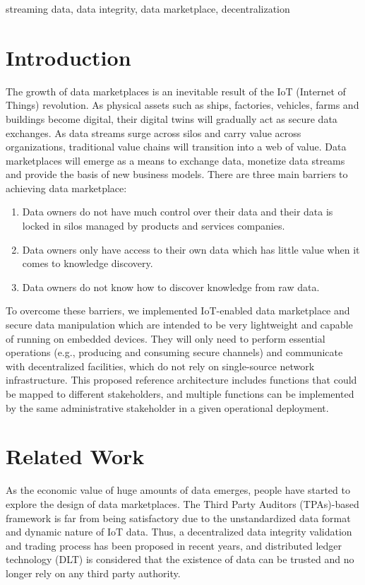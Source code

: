 \documentclass[journal,10pt,a4paper]{IEEEtran}
\begin{document}
\begin{IEEEkeywords}
    streaming data, data integrity, data marketplace, decentralization
\end{IEEEkeywords}

\section{\normalsize\textbf{Introduction}}
The growth of data marketplaces is an inevitable result of the IoT (Internet of Things) revolution. As physical assets such as ships, factories, vehicles, farms and buildings become digital, their digital twins will gradually act as secure data exchanges.\cite{digitaltwin}\cite{AutonomousDriving} As data streams surge across silos and carry value across organizations, traditional value chains will transition into a web of value. Data marketplaces will emerge as a means to exchange data, monetize data streams and provide the basis of new business models. There are three main barriers to achieving data marketplace:
\begin{enumerate}
    \item Data owners do not have much control over their data and their data is locked in silos managed by products and services companies.
    \item Data owners only have access to their own data which has little value when it comes to knowledge discovery.
    \item Data owners do not know how to discover knowledge from raw data.
\end{enumerate}

To overcome these barriers, we implemented IoT-enabled data marketplace and secure data manipulation which are intended to be very lightweight and capable of running on embedded devices. They will only need to perform essential operations (e.g., producing and consuming secure channels) and communicate with decentralized facilities, which do not rely on single-source network infrastructure. This proposed reference architecture includes functions that could be mapped to different stakeholders, and multiple functions can be implemented by the same administrative stakeholder in a given operational deployment.

\section{\normalsize\textbf{Related Work}}
As the economic value of huge amounts of data emerges, people have started to explore the design of data marketplaces. The Third Party Auditors (TPAs)-based framework\cite{TPA} is far from being satisfactory due to the unstandardized data format and dynamic nature of IoT data. Thus, a decentralized data integrity validation and trading process has been proposed in recent years, and distributed ledger technology (DLT) is considered that the existence of data can be trusted and no longer rely on any third party authority.
\end{document}
